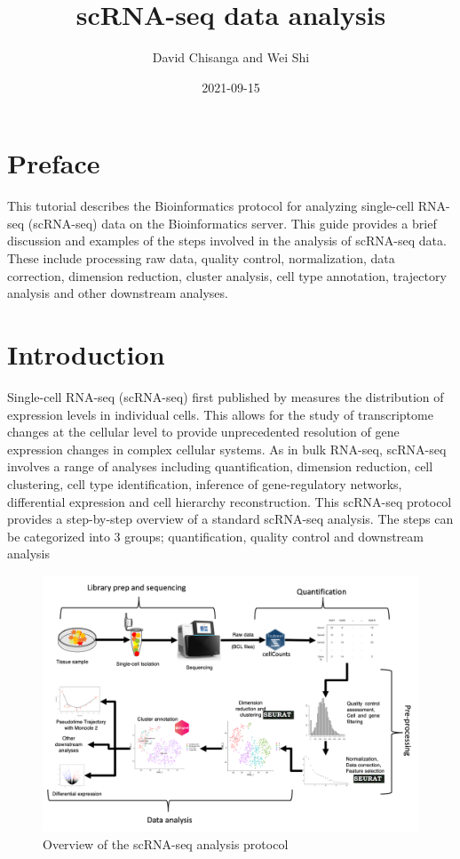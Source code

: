 \documentclass[
]{book}
\title{scRNA-seq data analysis}
\author{David Chisanga and Wei Shi}
\date{2021-09-15}
\begin{document}
\maketitle

{
\setcounter{tocdepth}{1}
\tableofcontents
}
\hypertarget{preface}{%
\chapter{Preface}\label{preface}}

This tutorial describes the Bioinformatics protocol for analyzing single-cell RNA-seq (scRNA-seq) data on the Bioinformatics server. This guide provides a brief discussion and examples of the steps involved in the analysis of scRNA-seq data. These include processing raw data, quality control, normalization, data correction, dimension reduction, cluster analysis, cell type annotation, trajectory analysis and other downstream analyses.

\hypertarget{intro}{%
\chapter{Introduction}\label{intro}}

Single-cell RNA-seq (scRNA-seq) first published by \citep{tang2009mrna} measures the distribution of expression levels in individual cells. This allows for the study of transcriptome changes at the cellular level to provide unprecedented resolution of gene expression changes in complex cellular systems. As in bulk RNA-seq, scRNA-seq involves a range of analyses including quantification, dimension reduction, cell clustering, cell type identification, inference of gene-regulatory networks, differential expression and cell hierarchy reconstruction. This scRNA-seq protocol provides a step-by-step overview of a standard scRNA-seq analysis. The steps can be categorized into 3 groups; quantification, quality control and downstream analysis

\begin{landscape}
\begin{figure}

{\centering \includegraphics[width=26.67in]{Fig1} 

}

\caption{Overview of the scRNA-seq analysis protocol}\label{fig:fig1}
\end{figure}
\end{landscape}
\end{document}
